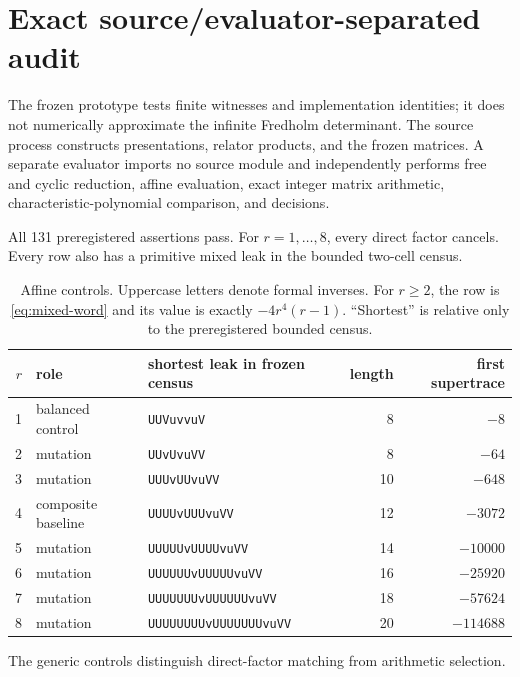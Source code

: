 \section{Exact source/evaluator-separated audit}
\label{sec:audit}

The frozen prototype tests finite witnesses and implementation identities; it
does not numerically approximate the infinite Fredholm determinant.  The
source process constructs presentations, relator products, and the frozen
matrices.  A separate evaluator imports no source module and independently
performs free and cyclic reduction, affine evaluation, exact integer matrix
arithmetic, characteristic-polynomial comparison, and decisions.

All 131 preregistered assertions pass.  For $r=1,\ldots,8$, every direct
factor cancels.  Every row also has a primitive mixed leak in the bounded
two-cell census.

\begin{table}[H]
\centering
\small
\begin{tabular}{@{}rllrr@{}}
\toprule
$r$ & role & shortest leak in frozen census & length & first supertrace \\
\midrule
1 & balanced control & \texttt{UUVuvvuV} & 8 & $-8$ \\
2 & mutation & \texttt{UUvUvuVV} & 8 & $-64$ \\
3 & mutation & \texttt{UUUvUUvuVV} & 10 & $-648$ \\
4 & composite baseline & \texttt{UUUUvUUUvuVV} & 12 & $-3072$ \\
5 & mutation & \texttt{UUUUUvUUUUvuVV} & 14 & $-10000$ \\
6 & mutation & \texttt{UUUUUUvUUUUUvuVV} & 16 & $-25920$ \\
7 & mutation & \texttt{UUUUUUUvUUUUUUvuVV} & 18 & $-57624$ \\
8 & mutation & \texttt{UUUUUUUUvUUUUUUUvuVV} & 20 & $-114688$ \\
\bottomrule
\end{tabular}
\caption{Affine controls.  Uppercase letters denote formal inverses.  For
$r\ge2$, the row is \cref{eq:mixed-word} and its value is exactly
$-4r^4(r-1)$.  ``Shortest'' is relative only to the preregistered bounded
census.}
\label{tab:affine-audit}
\end{table}

The generic controls distinguish direct-factor matching from arithmetic
selection.

